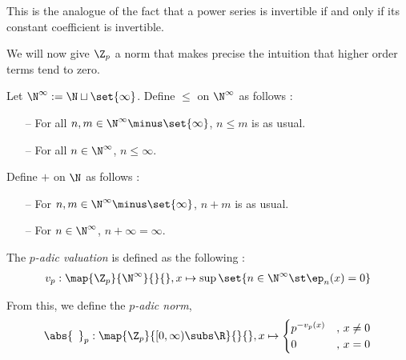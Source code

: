 \begin{rmk}
 
  This is the analogue of the fact that a power series is invertible 
  if and only if its constant coefficient is invertible. 
\end{rmk}

We will now give $\Z_p$ a norm that makes precise 
the intuition that higher order terms tend to zero. 

\begin{dfn}
  
  Let $\N^\infty := \N \sqcup \set{\infty}$.
  Define $\leq$ on $\N^\infty$ as follows : 
  \begin{itemize}
    \item[--] For all $n, m \in \N^\infty\minus\set{\infty}$, 
    $n \leq m$ is as usual. 
    \item[--] For all $n \in \N^\infty$, $n \leq \infty$. 
  \end{itemize}

  Define $+$ on $\N$ as follows : 
  \begin{itemize}
    \item[--] For $n, m \in \N^\infty\minus\set{\infty}$, $n + m$ is as usual. 
    \item[--] For $n \in \N^\infty$, $n + \infty = \infty$. 
  \end{itemize}
\end{dfn}

\begin{dfn}
  
  The \emph{$p$-adic valuation} is defined as the following : 
  \begin{align*}
    v_p : \map{\Z_p}{\N^\infty}{}{}, 
    x \mapsto \sup\set{n \in \N^\infty \st \ep_n(x) = 0}
  \end{align*}

  From this, we define the \emph{$p$-adic norm}, 
  \begin{align*}
    \abs{\hspace{5pt}}_p : \map{\Z_p}{[0,\infty)\subs \R}{}{}, 
    x \mapsto \begin{cases}
      p^{-v_p(x)} &,\, x \neq 0 \\
      0 &,\, x = 0
    \end{cases}
  \end{align*}
\end{dfn}

